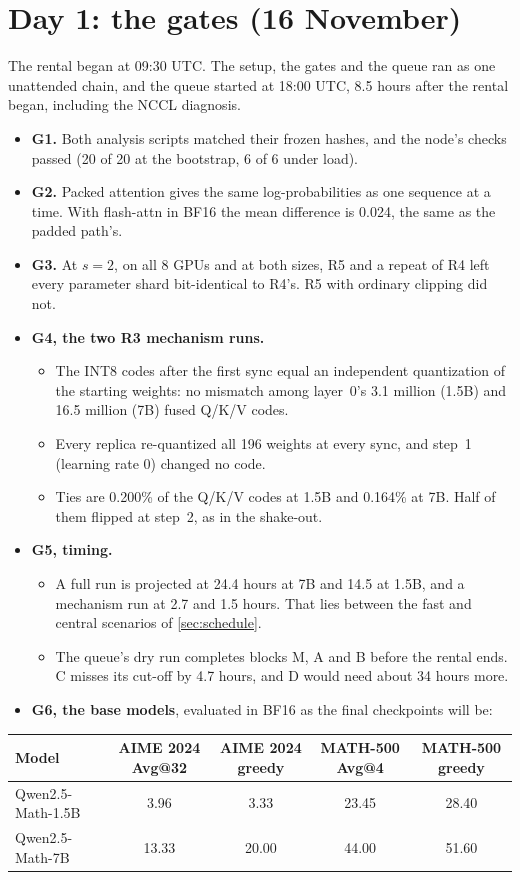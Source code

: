 \documentclass[11pt]{article}
\begin{document}
\section{Day 1: the gates (16 November)}\label{sec:day1}
The rental began at 09:30 UTC. The setup, the gates and the queue ran as one unattended chain, and the queue started at 18:00 UTC, 8.5 hours after the rental began, including the NCCL diagnosis.
\begin{itemize}
\item \textbf{G1.} Both analysis scripts matched their frozen hashes, and the node's checks passed (20 of 20 at the bootstrap, 6 of 6 under load).
\item \textbf{G2.} Packed attention gives the same log-probabilities as one sequence at a time. With flash-attn in BF16 the mean difference is 0.024, the same as the padded path's.
\item \textbf{G3.} At $s=2$, on all 8 GPUs and at both sizes, R5 and a repeat of R4 left every parameter shard bit-identical to R4's. R5 with ordinary clipping did not.
\item \textbf{G4, the two R3 mechanism runs.}
  \begin{itemize}
  \item The INT8 codes after the first sync equal an independent quantization of the starting weights: no mismatch among layer~0's 3.1 million (1.5B) and 16.5 million (7B) fused Q/K/V codes.
  \item Every replica re-quantized all 196 weights at every sync, and step~1 (learning rate 0) changed no code.
  \item Ties are 0.200\% of the Q/K/V codes at 1.5B and 0.164\% at 7B. Half of them flipped at step~2, as in the shake-out.
  \end{itemize}
\item \textbf{G5, timing.}
  \begin{itemize}
  \item A full run is projected at 24.4 hours at 7B and 14.5 at 1.5B, and a mechanism run at 2.7 and 1.5 hours. That lies between the fast and central scenarios of \cref{sec:schedule}.
  \item The queue's dry run completes blocks M, A and B before the rental ends. C misses its cut-off by 4.7 hours, and D would need about 34 hours more.
  \end{itemize}
\item \textbf{G6, the base models}, evaluated in BF16 as the final checkpoints will be:
\end{itemize}
\begin{center}\small
\begin{tabular}{@{}l c c c c@{}}
\toprule
Model & AIME 2024 Avg@32 & AIME 2024 greedy & MATH-500 Avg@4 & MATH-500 greedy\\
\midrule
Qwen2.5-Math-1.5B & 3.96 & 3.33 & 23.45 & 28.40\\
Qwen2.5-Math-7B & 13.33 & 20.00 & 44.00 & 51.60\\
\bottomrule
\end{tabular}
\end{center}
\end{document}
